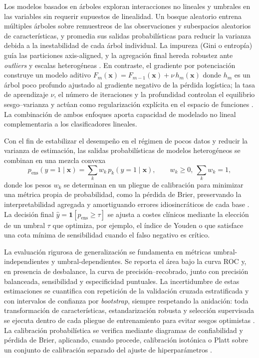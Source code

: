 Los modelos basados en árboles exploran interacciones no lineales y umbrales en las variables sin requerir supuestos de linealidad. Un bosque aleatorio entrena múltiples árboles sobre remuestreos de las observaciones y subespacios aleatorios de características, y promedia sus salidas probabilísticas para reducir la varianza debida a la inestabilidad de cada árbol individual. La impureza (Gini o entropía) guía las particiones axis-aligned, y la agregación final hereda robustez ante \emph{outliers} y escalas heterogéneas \cite{Pedregosa2011}. En contraste, el gradiente por potenciación construye un modelo aditivo \(F_{m}(\mathbf{x})=F_{m-1}(\mathbf{x})+\nu\,h_{m}(\mathbf{x})\) donde \(h_{m}\) es un árbol poco profundo ajustado al gradiente negativo de la pérdida logística; la tasa de aprendizaje \(\nu\), el número de iteraciones y la profundidad controlan el equilibrio sesgo–varianza y actúan como regularización explícita en el espacio de funciones \cite{Friedman2001}. La combinación de ambos enfoques aporta capacidad de modelado no lineal complementaria a los clasificadores lineales.

Con el fin de estabilizar el desempeño en el régimen de pocos datos y reducir la varianza de estimación, las salidas probabilísticas de modelos heterogéneos se combinan en una mezcla convexa
\begin{equation}
p_{\mathrm{ens}}(y=1\mid\mathbf{x})=\sum_{k}w_{k}\,p_{k}(y=1\mid\mathbf{x}),\qquad w_{k}\ge 0,\ \sum_{k}w_{k}=1,
\label{eq:softvote}
\end{equation}
donde los pesos \(w_{k}\) se determinan en un pliegue de calibración para minimizar una métrica propia de probabilidad, como la pérdida de Brier, preservando la interpretabilidad agregada y amortiguando errores idiosincráticos de cada base \cite{Pedregosa2011}. La decisión final \(\hat y=\mathbf{1}[p_{\mathrm{ens}}\ge \tau]\) se ajusta a costes clínicos mediante la elección de un umbral \(\tau\) que optimiza, por ejemplo, el índice de Youden o que satisface una cota mínima de sensibilidad cuando el falso negativo es crítico.

La evaluación rigurosa de generalización se fundamenta en métricas umbral-independientes y umbral-dependientes. Se reporta el área bajo la curva ROC y, en presencia de desbalance, la curva de precisión–recobrado, junto con precisión balanceada, sensibilidad y especificidad puntuales. La incertidumbre de estas estimaciones se cuantifica con repetición de la validación cruzada estratificada y con intervalos de confianza por \emph{bootstrap}, siempre respetando la anidación: toda transformación de características, estandarización robusta y selección supervisada se ejecuta dentro de cada pliegue de entrenamiento para evitar sesgos optimistas \cite{Vabalas2019,Tsamardinos2022}. La calibración probabilística se verifica mediante diagramas de confiabilidad y pérdida de Brier, aplicando, cuando procede, calibración isotónica o Platt sobre un conjunto de calibración separado del ajuste de hiperparámetros \cite{Pedregosa2011}.

